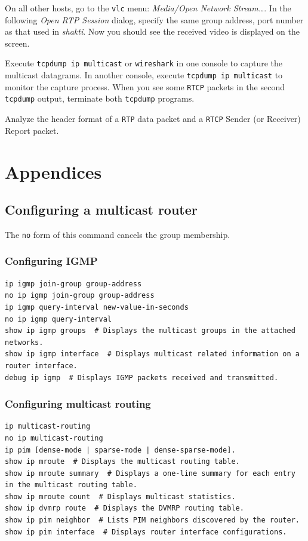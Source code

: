 \documentclass{../UTNetLab}
\begin{document}
    On all other hosts, go to the \lstinline{vlc} menu: \textit{Media/Open Network Stream\ldots}. In the following \textit{Open RTP Session} dialog, specify the same group address, port number as that used in \textit{shakti}.%
    Now you should see the received video is displayed on the screen. 

    Execute \lstinline{tcpdump ip multicast} or \lstinline{wireshark} in one console to capture the multicast datagrams.
    In another console, execute \lstinline{tcpdump ip multicast} to monitor the capture process.
    When you see some \texttt{RTCP} packets in the second \lstinline{tcpdump} output, terminate both \lstinline{tcpdump} programs. 

    Analyze the header format of a \texttt{RTP} data packet and a \texttt{RTCP} Sender (or Receiver) Report packet.


    \appendix
\section*{Appendices}
\renewcommand{\thesubsection}{\Alph{subsection}}

\subsection{Configuring a multicast router}
The \lstinline[language={cisco}]{no} form of this command cancels the group membership.
\subsubsection{Configuring IGMP}
\begin{lstlisting}[language={cisco}, emph={new-value-in-seconds, }]
ip igmp join-group group-address
no ip igmp join-group group-address
ip igmp query-interval new-value-in-seconds
no ip igmp query-interval
show ip igmp groups  # Displays the multicast groups in the attached networks.
show ip igmp interface  # Displays multicast related information on a router interface.
debug ip igmp  # Displays IGMP packets received and transmitted.
\end{lstlisting}

\subsubsection{Configuring multicast routing}
\begin{lstlisting}[language={cisco}]
ip multicast-routing
no ip multicast-routing
ip pim [dense-mode | sparse-mode | dense-sparse-mode].
show ip mroute  # Displays the multicast routing table.
show ip mroute summary  # Displays a one-line summary for each entry in the multicast routing table.
show ip mroute count  # Displays multicast statistics.
show ip dvmrp route  # Displays the DVMRP routing table.
show ip pim neighbor  # Lists PIM neighbors discovered by the router.
show ip pim interface  # Displays router interface configurations.
\end{lstlisting}
\end{document}
